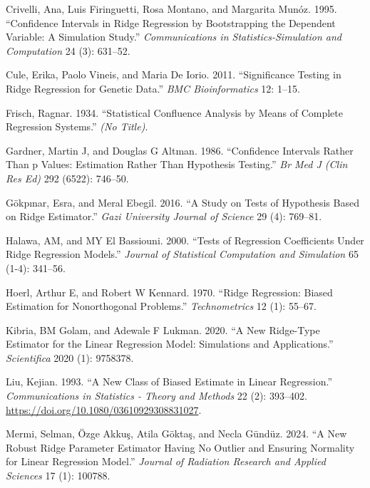\documentclass[
]{interact}
\newlength{\cslhangindent}
\newenvironment{CSLReferences}[2] %
 {\begin{list}{}{%
  \setlength{\itemindent}{0pt}
  \setlength{\leftmargin}{0pt}
  \setlength{\parsep}{0pt}
  \ifodd #1
   \setlength{\leftmargin}{\cslhangindent}
   \setlength{\itemindent}{-1\cslhangindent}
  \fi
  \setlength{\itemsep}{#2\baselineskip}}}
 {\end{list}}
\begin{document}
\label{refs}
\begin{CSLReferences}{1}{0}
Crivelli, Ana, Luis Firinguetti, Rosa Montano, and Margarita Munóz.
1995. {``Confidence Intervals in Ridge Regression by Bootstrapping the
Dependent Variable: A Simulation Study.''} \emph{Communications in
Statistics-Simulation and Computation} 24 (3): 631--52.

Cule, Erika, Paolo Vineis, and Maria De Iorio. 2011. {``Significance
Testing in Ridge Regression for Genetic Data.''} \emph{BMC
Bioinformatics} 12: 1--15.

Frisch, Ragnar. 1934. {``Statistical Confluence Analysis by Means of
Complete Regression Systems.''} \emph{(No Title)}.

Gardner, Martin J, and Douglas G Altman. 1986. {``Confidence Intervals
Rather Than p Values: Estimation Rather Than Hypothesis Testing.''}
\emph{Br Med J (Clin Res Ed)} 292 (6522): 746--50.

Gökpınar, Esra, and Meral Ebegil. 2016. {``A Study on Tests of
Hypothesis Based on Ridge Estimator.''} \emph{Gazi University Journal of
Science} 29 (4): 769--81.

Halawa, AM, and MY El Bassiouni. 2000. {``Tests of Regression
Coefficients Under Ridge Regression Models.''} \emph{Journal of
Statistical Computation and Simulation} 65 (1-4): 341--56.

Hoerl, Arthur E, and Robert W Kennard. 1970. {``Ridge Regression: Biased
Estimation for Nonorthogonal Problems.''} \emph{Technometrics} 12 (1):
55--67.

Kibria, BM Golam, and Adewale F Lukman. 2020. {``A New Ridge-Type
Estimator for the Linear Regression Model: Simulations and
Applications.''} \emph{Scientifica} 2020 (1): 9758378.

Liu, Kejian. 1993. {``A New Class of Biased Estimate in Linear
Regression.''} \emph{Communications in Statistics - Theory and Methods}
22 (2): 393--402. \url{https://doi.org/10.1080/03610929308831027}.

Mermi, Selman, Özge Akkuş, Atila Göktaş, and Necla Gündüz. 2024. {``A
New Robust Ridge Parameter Estimator Having No Outlier and Ensuring
Normality for Linear Regression Model.''} \emph{Journal of Radiation
Research and Applied Sciences} 17 (1): 100788.


\end{CSLReferences}
\end{document}
